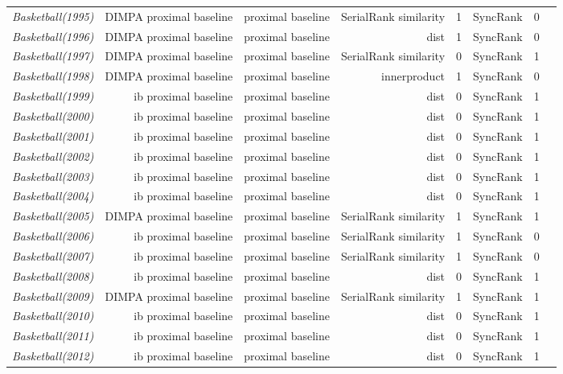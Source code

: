 \documentclass[nohyperref]{article}
\theoremstyle{plain}
\theoremstyle{definition}
\theoremstyle{remark}
\begin{document}
\begin{table*}[!ht]
{\begin{tabular}{lrrrrrrr}
			{\it Basketball(1995)} & DIMPA proximal baseline & proximal baseline & SerialRank similarity & 1 & SyncRank & 0 \\
			{\it Basketball(1996)} & DIMPA proximal baseline & proximal baseline & dist & 1 & SyncRank & 0 \\
			{\it Basketball(1997)} & DIMPA proximal baseline & proximal baseline & SerialRank similarity & 0 & SyncRank & 1 \\
			{\it Basketball(1998)} & DIMPA proximal baseline & proximal baseline & innerproduct & 1 & SyncRank & 0 \\
			{\it Basketball(1999)} & ib proximal baseline & proximal baseline & dist & 0 & SyncRank & 1 \\
			{\it Basketball(2000)} & ib proximal baseline & proximal baseline & dist & 0 & SyncRank & 1 \\
			{\it Basketball(2001)} & ib proximal baseline & proximal baseline & dist & 0 & SyncRank & 1 \\
			{\it Basketball(2002)} & ib proximal baseline & proximal baseline & dist & 0 & SyncRank & 1 \\
			{\it Basketball(2003)} & ib proximal baseline & proximal baseline & dist & 0 & SyncRank & 1 \\
			{\it Basketball(2004)} & ib proximal baseline & proximal baseline & dist & 0 & SyncRank & 1 \\
			{\it Basketball(2005)} & DIMPA proximal baseline & proximal baseline & SerialRank similarity & 1 & SyncRank & 1 \\
			{\it Basketball(2006)} & ib proximal baseline & proximal baseline & SerialRank similarity & 1 & SyncRank & 0 \\
			{\it Basketball(2007)} & ib proximal baseline & proximal baseline & SerialRank similarity & 1 & SyncRank & 0 \\
			{\it Basketball(2008)} & ib proximal baseline & proximal baseline & dist & 0 & SyncRank & 1 \\
			{\it Basketball(2009)} & DIMPA proximal baseline & proximal baseline & SerialRank similarity & 1 & SyncRank & 1 \\
			{\it Basketball(2010)} & ib proximal baseline & proximal baseline & dist & 0 & SyncRank & 1 \\
			{\it Basketball(2011)} & ib proximal baseline & proximal baseline & dist & 0 & SyncRank & 1 \\
			{\it Basketball(2012)} & ib proximal baseline & proximal baseline & dist & 0 & SyncRank & 1 \\

\end{tabular}}
\end{table*}
\end{document}
